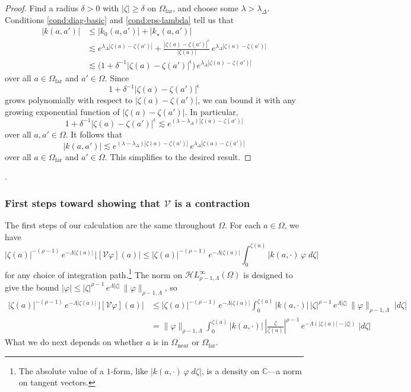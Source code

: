 \documentclass{article}
\theoremstyle{plain}
\newcommand{\C}{\mathbb{C}}
\newcommand{\singexp}[2]{\mathcal{H}L^\infty_{#1, #2}}
\newcommand{\volterra}{\mathcal{V}}
\newcommand{\kerwhole}{k}
\newcommand{\hardker}{k_0}
\newcommand{\softker}{k_\star}
\newcommand{\domain}{\Omega}
\newcommand{\near}{\Omega_\text{near}}
\newcommand{\far}{\Omega_\text{far}}
\begin{document}
\begin{proof}
Find a radius $\delta > 0$ with $|\zeta| \ge \delta$ on $\domain_\text{far}$, and choose some $\lambda > \lambda_\Delta$. Conditions \eqref{cond:diag-basic} and \eqref{cond:eps-lambda} tell us that
\begin{align*}
|\kerwhole(a,a')|&\leq |\hardker(a,a')| + |\softker(a,a')|\\
&\lesssim e^{\lambda_\Delta |\zeta(a)-\zeta(a')|} + \frac{|\zeta(a)-\zeta(a')|^\epsilon}{|\zeta(a)|}\,e^{\lambda_\Delta|\zeta(a)-\zeta(a')|}\\
&\lesssim \big(1 + \delta^{-1} |\zeta(a)-\zeta(a')|^\epsilon \big) \, e^{\lambda_\Delta|\zeta(a)-\zeta(a')|}
\end{align*}
over all $a \in \domain_\text{far}$ and $a' \in \domain$. Since
\[ 1 + \delta^{-1}|\zeta(a)-\zeta(a')|^\epsilon \]
grows polynomially with respect to $|\zeta(a)-\zeta(a')|$, we can bound it with any growing exponential function of $|\zeta(a)-\zeta(a')|$. In particular,
\[ 1 + \delta^{-1}|\zeta(a)-\zeta(a')|^\epsilon \lesssim e^{(\lambda - \lambda_\Delta) |\zeta(a)-\zeta(a')|} \]
over all $a, a' \in \domain$. It follows that
\[ |\kerwhole(a,a')| \lesssim e^{(\lambda - \lambda_\Delta) |\zeta(a)-\zeta(a')|} \, e^{\lambda_\Delta|\zeta(a)-\zeta(a')|} \]
over all $a \in \domain_\text{far}$ and $a' \in \domain$. This simplifies to the desired result.
\end{proof}.
\subsubsection{First steps toward showing that $\volterra$ is a contraction}\label{first-steps}
The first steps of our calculation are the same throughout $\domain$. For each $a \in \domain$, we have
\[ |\zeta(a)|^{-(\rho-1)}\,e^{-\Lambda|\zeta(a)|}\,|[\volterra\varphi](a)| \le |\zeta(a)|^{-(\rho-1)}\,e^{-\Lambda|\zeta(a)|} \int_0^{\zeta(a)} |k(a, \cdot)\,\varphi\;d\zeta| \]
for any choice of integration path.\footnote{The absolute value of a $1$-form, like $|k(a, \cdot)\,\varphi\;d\zeta|$, is a density on $\C$---a norm on tangent vectors.} The norm on $\singexp{\rho-1}{\Lambda}(\domain)$ is designed to give the bound $|\varphi| \le |\zeta|^{\rho-1}\,e^{\Lambda |\zeta|}\,\|\varphi\|_{\rho-1, \Lambda}$, so
\begin{align*}
|\zeta(a)|^{-(\rho-1)}\,e^{-\Lambda|\zeta(a)|}\,|[\volterra\varphi](a)| & \le |\zeta(a)|^{-(\rho-1)}\,e^{-\Lambda|\zeta(a)|} \int_0^{\zeta(a)} |k(a, \cdot)|\,|\zeta|^{\rho-1}\,e^{\Lambda |\zeta|}\,\|\varphi\|_{\rho-1, \Lambda}\;|d\zeta| \\
& = \|\varphi\|_{\rho-1, \Lambda} \int_0^{\zeta(a)} |k(a, \cdot)|\,\left|\frac{\zeta}{\zeta(a)}\right|^{\rho-1}\,e^{-\Lambda(|\zeta(a)| - |\zeta|)}\;|d\zeta|
\end{align*}
What we do next depends on whether $a$ is in $\near$ or $\far$.
\end{document}
